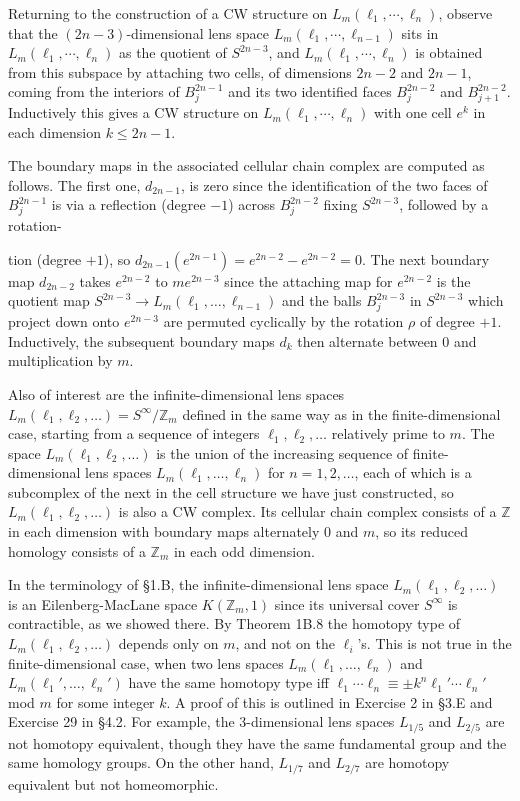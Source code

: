 Returning to the construction of a CW structure on $L_m(\ell_1, \cdots, \ell_n)$, observe that the $(2n-3)$-dimensional lens space $L_m(\ell_1, \cdots, \ell_{n-1})$ sits in $L_m(\ell_1, \cdots, \ell_n)$ as the quotient of $S^{2n-3}$, and $L_m(\ell_1, \cdots, \ell_n)$ is obtained from this subspace by attaching two cells, of dimensions $2n-2$ and $2n-1$, coming from the interiors of $B_j^{2n-1}$ and its two identified faces $B_j^{2n-2}$ and $B_{j+1}^{2n-2}$. Inductively this gives a CW structure on $L_m(\ell_1, \cdots, \ell_n)$ with one cell $e^k$ in each dimension $k \le 2n-1$.

The boundary maps in the associated cellular chain complex are computed as follows. The first one, $d_{2n-1}$, is zero since the identification of the two faces of $B_j^{2n-1}$ is via a reflection (degree $-1$) across $B_j^{2n-2}$ fixing $S^{2n-3}$, followed by a rotation-



tion (degree $+1$), so $d_{2n-1}(e^{2n-1}) = e^{2n-2} - e^{2n-2} = 0$. The next boundary map
$d_{2n-2}$ takes $e^{2n-2}$ to $me^{2n-3}$ since the attaching map for $e^{2n-2}$ is the quotient map
$S^{2n-3} \to L_m(\ell_1, \ldots, \ell_{n-1})$ and the balls $B_j^{2n-3}$ in $S^{2n-3}$ which project down onto $e^{2n-3}$
are permuted cyclically by the rotation $\rho$ of degree $+1$. Inductively, the subsequent
boundary maps $d_k$ then alternate between $0$ and multiplication by $m$.

Also of interest are the infinite-dimensional lens spaces $L_m(\ell_1, \ell_2, \ldots) = S^\infty/\mathbb{Z}_m$
defined in the same way as in the finite-dimensional case, starting from a sequence of
integers $\ell_1, \ell_2, \ldots$ relatively prime to $m$. The space $L_m(\ell_1, \ell_2, \ldots)$ is the union of the
increasing sequence of finite-dimensional lens spaces $L_m(\ell_1, \ldots, \ell_n)$ for $n = 1, 2, \ldots$,
each of which is a subcomplex of the next in the cell structure we have just constructed, so $L_m(\ell_1, \ell_2, \ldots)$ is also a CW complex. Its cellular chain complex consists
of a $\mathbb{Z}$ in each dimension with boundary maps alternately $0$ and $m$, so its reduced
homology consists of a $\mathbb{Z}_m$ in each odd dimension.

In the terminology of \S1.B, the infinite-dimensional lens space $L_m(\ell_1, \ell_2, \ldots)$ is
an Eilenberg-MacLane space $K(\mathbb{Z}_m, 1)$ since its universal cover $S^\infty$ is contractible, as
we showed there. By Theorem 1B.8 the homotopy type of $L_m(\ell_1, \ell_2, \ldots)$ depends
only on $m$, and not on the $\ell_i$'s. This is not true in the finite-dimensional case, when
two lens spaces $L_m(\ell_1, \ldots, \ell_n)$ and $L_m(\ell_1', \ldots, \ell_n')$ have the same homotopy type
iff $\ell_1 \cdots \ell_n \equiv \pm k^n \ell_1' \cdots \ell_n'$ mod $m$ for some integer $k$. A proof of this is outlined in
Exercise 2 in \S3.E and Exercise 29 in \S4.2. For example, the 3-dimensional lens spaces
$L_{1/5}$ and $L_{2/5}$ are not homotopy equivalent, though they have the same fundamental
group and the same homology groups. On the other hand, $L_{1/7}$ and $L_{2/7}$ are homotopy
equivalent but not homeomorphic.

